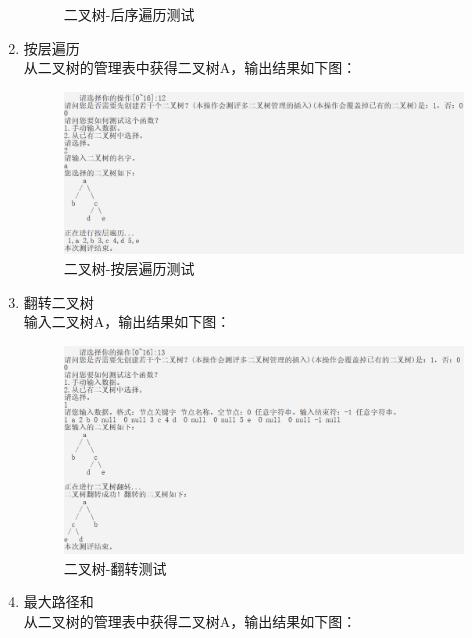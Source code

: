 \documentclass[supercite]{Experimental_Report}
\theoremstyle{definition}
\begin{document}
\begin{enumerate}
\begin{figure}[htb]
\begin{center}
				\caption{二叉树-后序遍历测试}
				\label{fig2-11}
			\end{center}
		\end{figure}
	\item 按层遍历\\
	从二叉树的管理表中获得二叉树A，输出结果如下图：
		\begin{figure}[htb]
			\begin{center}
				\includegraphics[scale=0.50]{images/二叉树-按层遍历.png}
				\caption{二叉树-按层遍历测试}
				\label{fig2-12}
			\end{center}
		\end{figure}
		\newpage
	\item 翻转二叉树\\
	输入二叉树A，输出结果如下图：
		\begin{figure}[htb]
			\begin{center}
				\includegraphics[scale=0.50]{images/二叉树-翻转.png}
				\caption{二叉树-翻转测试}
				\label{fig2-13}
			\end{center}
		\end{figure}
	\item 最大路径和\\
	从二叉树的管理表中获得二叉树A，输出结果如下图：
		\begin{figure}[htb]
			\begin{center}

\end{center}
\end{figure}
\end{enumerate}
\end{document}
